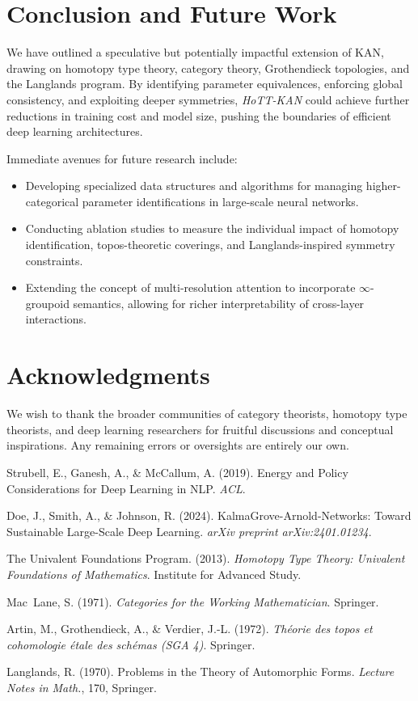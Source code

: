 \documentclass{article}
\begin{document}
\section{Conclusion and Future Work}
\label{sec:conclusion}

We have outlined a speculative but potentially impactful extension of KAN, drawing on homotopy type theory, category theory, Grothendieck topologies, and the Langlands program. By identifying parameter equivalences, enforcing global consistency, and exploiting deeper symmetries, \emph{HoTT-KAN} could achieve further reductions in training cost and model size, pushing the boundaries of efficient deep learning architectures.

Immediate avenues for future research include:
\begin{itemize}
    \item Developing specialized data structures and algorithms for managing higher-categorical parameter identifications in large-scale neural networks.
    \item Conducting ablation studies to measure the individual impact of homotopy identification, topos-theoretic coverings, and Langlands-inspired symmetry constraints.
    \item Extending the concept of multi-resolution attention to incorporate $\infty$-groupoid semantics, allowing for richer interpretability of cross-layer interactions.
\end{itemize}

\section*{Acknowledgments}
We wish to thank the broader communities of category theorists, homotopy type theorists, and deep learning researchers for fruitful discussions and conceptual inspirations. Any remaining errors or oversights are entirely our own.


\begin{thebibliography}{99}

Strubell, E., Ganesh, A., \& McCallum, A. (2019).
Energy and Policy Considerations for Deep Learning in NLP.
\emph{ACL}.

Doe, J., Smith, A., \& Johnson, R. (2024).
KalmaGrove-Arnold-Networks: Toward Sustainable Large-Scale Deep Learning.
\emph{arXiv preprint arXiv:2401.01234}.

The Univalent Foundations Program. (2013).
\emph{Homotopy Type Theory: Univalent Foundations of Mathematics}.
Institute for Advanced Study.

Mac~Lane, S. (1971).
\emph{Categories for the Working Mathematician}.
Springer.

Artin, M., Grothendieck, A., \& Verdier, J.-L. (1972).
\emph{Théorie des topos et cohomologie étale des schémas (SGA 4)}.
Springer.

Langlands, R. (1970).
Problems in the Theory of Automorphic Forms.
\emph{Lecture Notes in Math.}, 170, Springer.

\end{thebibliography}
\end{document}
